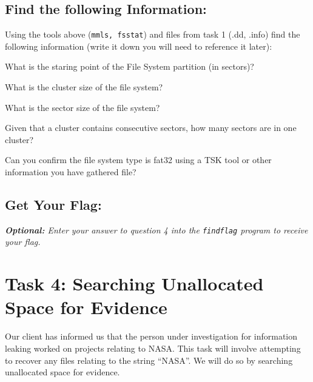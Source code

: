 \documentclass[a4paper,11pt]{article}
\begin{document}
\subsection*{Find the following Information:}
Using the tools above (\texttt{mmls, fsstat}) and files from task 1 (.dd, .info) find the following information (write it down you will need to reference it later):
\begin{enumerate*}
	\item What is the staring point of the File System partition (in sectors)?
	\item What is the cluster size of the file system?
	\item What is the sector size of the file system?
	\item Given that a cluster contains consecutive sectors, how many sectors are in one cluster?
	\item Can you confirm the file system type is fat32 using a TSK tool or other information you have gathered file?
\end{enumerate*}

\subsection*{Get Your Flag:}
\noindent
\textit{\textbf{Optional:} Enter your answer to question 4 into the \texttt{findflag} program to receive your flag.}

\section{Task 4: Searching Unallocated Space for Evidence}
Our client has informed us that the person under investigation for information leaking worked on projects relating to NASA. This task will involve attempting to recover any files relating to the string ``NASA''. We will do so by searching unallocated space for evidence.
\end{document}
